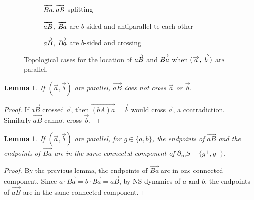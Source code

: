 \documentclass[11pt]{amsart}
\newcommand{\ora}[1]{\overrightarrow{#1}}
\newcommand*{\svgfignormal}[1]{\fontsize{9pt}{9pt}\selectfont}
\numberwithin{equation}{section}
\numberwithin{figure}{section}
\newtheorem{lemma}[theorem]{Lemma}
\theoremstyle{definition}
\theoremstyle{plain}
\begin{document}
\begin{figure}[hb]
  \centering
  \setlength{\abovecaptionskip}{3pt}
  \setlength{\belowcaptionskip}{0pt}

  \begin{subfigure}[t]{0.42\textwidth}
    \centering
    \resizebox{\linewidth}{!}{\svgfignormal{r3}}
    \caption{$\protect\ora{Ba},\protect\ora{aB}$ splitting}
    \label{fig:r3}
  \end{subfigure}
  \hfill
 \begin{subfigure}[t]{0.42\textwidth}
    \centering
    \resizebox{\linewidth}{!}{\svgfignormal{r1}}
    \caption{$\protect\ora{aB}$, $\protect\ora{Ba}$ are $b$-sided and antiparallel to each other}
    \label{fig:r1}
  \end{subfigure}
  \vspace{10pt}\par
  \begin{subfigure}[t]{0.42\textwidth}
    \centering
    \resizebox{\linewidth}{!}{\svgfignormal{c2}}
    \caption{$\protect\ora{aB}$, $\protect\ora{Ba}$ are $b$-sided and crossing}
    \label{fig:c2}
  \end{subfigure}

  \caption{Topological cases for the location of $\protect\ora{aB}$ and
    $\protect\ora{Ba}$ when $(\protect\ora{a},\protect\ora{b})$ are parallel.}
  \label{fig:cases-conn-smoothing}
\end{figure}

\begin{lemma}
If $(\ora{a},\ora{b})$ are parallel, $\ora{aB}$ does not cross $\ora{a}$ or $\ora{b}$.
\label{lem:aB_a_nocross}
\end{lemma}
\begin{proof}
If $\ora{aB}$ crossed $\ora{a}$, then $\ora{(bA)a}=\ora{b}$ would
cross $\ora{a}$, a contradiction. Similarly $\ora{aB}$ cannot cross $\ora{b}$.
\end{proof}

\begin{lemma}
If $(\ora{a},\ora{b})$ are parallel, for $g \in \{ a, b \}$, the
endpoints of $\ora{aB}$ and the endpoints of $\ora{Ba}$ are in the
same connected component of $\partial_\infty S - \{ g^+,g^-\}$.
\label{lem:aB_Ba_together}
\end{lemma}
\begin{proof}
  By the previous lemma, the endpoints of $\ora{Ba}$ are in one
  connected component.
  Since $a \cdot \ora{Ba} = b \cdot \ora{Ba} = \ora{aB}$, by NS dynamics of $a$ and $b$,
the endpoints of $\ora{aB}$ are in the same connected component.
\end{proof}
\end{document}
